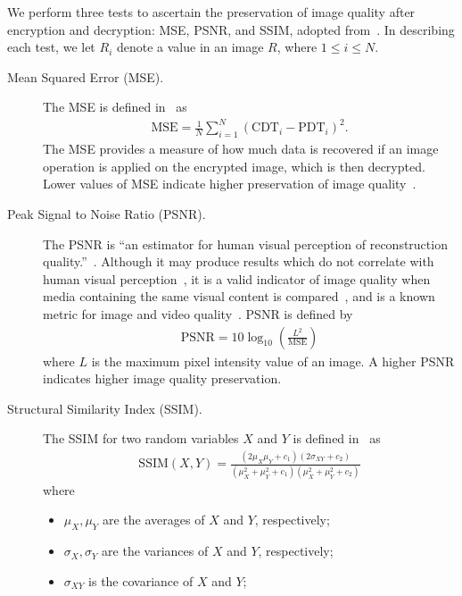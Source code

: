 We perform three tests to ascertain the preservation of image quality after encryption and decryption: MSE, PSNR, and SSIM, adopted from~\cite{ahmed_benchmark_2016, ahmad_efficiency_2012, wu_npcr_2011}. In describing each test, we let $R_i$ denote a value in an image $R$, where $1 \leq i \leq N$.
\begin{description}
	\item [Mean Squared Error (MSE).] The MSE is defined in~\cite{ahmed_benchmark_2016} as
	\begin{align}
        \mathrm{MSE} = \frac{1}{N}\sum_{i=1}^{N}{(\mathrm{CDT}_i - \mathrm{PDT}_i)^2}.
	\end{align}
	The MSE provides a measure of how much data is recovered if an image operation is applied on the encrypted image, which is then decrypted. Lower values of MSE indicate higher preservation of image quality~\cite{ahmed_benchmark_2016, ahmad_efficiency_2012}.
	\item [Peak Signal to Noise Ratio (PSNR).]
	The PSNR is ``an estimator for human visual perception of reconstruction quality.''~\cite{ahmed_benchmark_2016}. Although it may produce results which do not correlate with human visual perception~\cite{huynh-thu_accuracy_2012, ahmed_benchmark_2016}, it is a valid indicator of image quality when media containing the same visual content is compared~\cite{huynh-thu_accuracy_2012}, and is a known metric for image and video quality~\cite{upmanyu_efficient_2009, jain_image_2016, akramullah_video_2014}.
	PSNR is defined by
	\begin{align}
        \mathrm{PSNR} = 10\log_{10}{\left( \frac{L^2}{\mathrm{MSE}} \right)}
	\end{align}
	where $L$ is the maximum pixel intensity value of an image. A higher PSNR indicates higher image quality preservation.
	\item [Structural Similarity Index (SSIM).]
	The SSIM for two random variables $X$ and $Y$ is defined in~\cite{ahmed_benchmark_2016, akramullah_video_2014} as
	\begin{align}
        \mathrm{SSIM}(X,Y) = \frac{(2\mu_X\mu_Y+c_1)(2\sigma_{XY}+c_2)}{(\mu_X^2+\mu_Y^2+c_1)(\mu_X^2+\mu_Y^2+c_2)}
	\end{align}
	where
	\begin{itemize}
		\item $\mu_X, \mu_Y$ are the averages of $X$ and $Y$, respectively;
		\item $\sigma_X, \sigma_Y$ are the variances of $X$ and $Y$, respectively;
		\item $\sigma_{XY}$ is the covariance of $X$ and $Y$;

\end{itemize}
\end{description}
